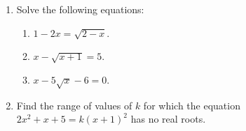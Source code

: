 \documentclass[11pt]{article}
\begin{document}
\begin{enumerate}
            \hrulefill
            
            \hrulefill
            
            \hrulefill
            
            \hrulefill
            
            \hrulefill

        \pagebreak
        \item Solve the following equations:\begin{enumerate}
            \item $1-2x=\sqrt{2-x}$.
            \item $x-\sqrt{x+1}=5$.
            \item $x-5\sqrt{x}-6=0$.
        \end{enumerate}

        \hrulefill
            
            \hrulefill
            
            \hrulefill
            
            \hrulefill
            
            \hrulefill
            
            \hrulefill
            
            \hrulefill
            
            \hrulefill
            
            \hrulefill
            
            \hrulefill
            
            \hrulefill

            \hrulefill
            
            \hrulefill
            
            \hrulefill
            
            \hrulefill
            
            \hrulefill
            
            \hrulefill
            
            \hrulefill
            
            \hrulefill
            
            \hrulefill
            
            \hrulefill
            
            \hrulefill

        \pagebreak
        \item Find the range of values of $k$ for which the equation $2x^2+x+5=k(x+1)^2$ has no real roots.
        

\end{enumerate}
\end{document}
